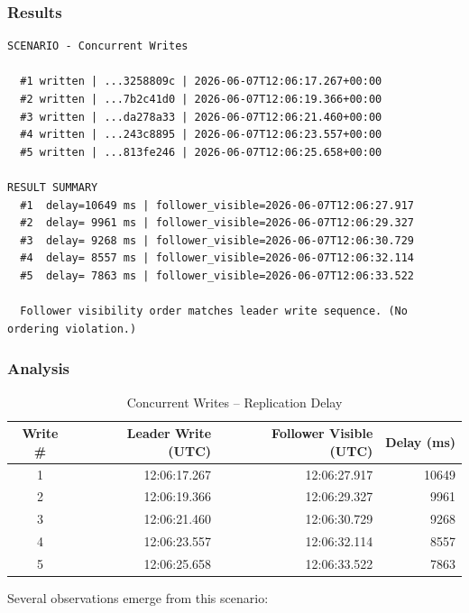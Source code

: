 \documentclass[12pt,a4paper]{article}
\begin{document}
\subsubsection{Results}

\begin{lstlisting}[style=outputstyle, caption={Concurrent Writes output}]
SCENARIO - Concurrent Writes

  #1 written | ...3258809c | 2026-06-07T12:06:17.267+00:00
  #2 written | ...7b2c41d0 | 2026-06-07T12:06:19.366+00:00
  #3 written | ...da278a33 | 2026-06-07T12:06:21.460+00:00
  #4 written | ...243c8895 | 2026-06-07T12:06:23.557+00:00
  #5 written | ...813fe246 | 2026-06-07T12:06:25.658+00:00

RESULT SUMMARY
  #1  delay=10649 ms | follower_visible=2026-06-07T12:06:27.917
  #2  delay= 9961 ms | follower_visible=2026-06-07T12:06:29.327
  #3  delay= 9268 ms | follower_visible=2026-06-07T12:06:30.729
  #4  delay= 8557 ms | follower_visible=2026-06-07T12:06:32.114
  #5  delay= 7863 ms | follower_visible=2026-06-07T12:06:33.522

  Follower visibility order matches leader write sequence. (No ordering violation.)
\end{lstlisting}

\subsubsection{Analysis}

\begin{table}[H]
\centering
\caption{Concurrent Writes -- Replication Delay}
\small
\begin{tabular}{crrr}
\toprule
\textbf{Write \#} & \textbf{Leader Write (UTC)} & \textbf{Follower Visible (UTC)} & \textbf{Delay (ms)} \\
\midrule
1 & 12:06:17.267 & 12:06:27.917 & 10649 \\
2 & 12:06:19.366 & 12:06:29.327 & 9961 \\
3 & 12:06:21.460 & 12:06:30.729 & 9268 \\
4 & 12:06:23.557 & 12:06:32.114 & 8557 \\
5 & 12:06:25.658 & 12:06:33.522 & 7863 \\
\bottomrule
\end{tabular}
\end{table}

Several observations emerge from this scenario:
\end{document}
